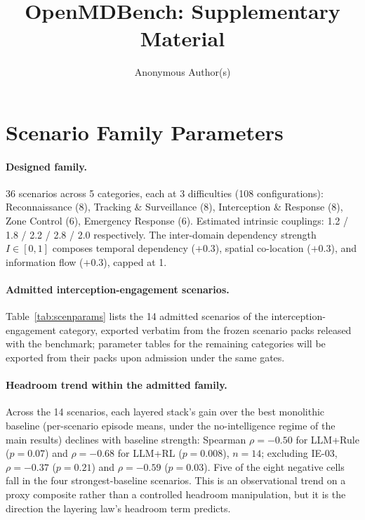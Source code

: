\documentclass[sigconf,anonymous]{aamas}
\title[OpenMDBench]{OpenMDBench: Supplementary Material}
\author{Anonymous Author(s)}
\affiliation{%
  \institution{Anonymous Institution}
  \city{}
  \country{}}
\begin{document}
\maketitle

\section{Scenario Family Parameters}\label{app:A}

\paragraph{Designed family.}
36 scenarios across 5 categories, each at 3 difficulties (108 configurations): Reconnaissance (8), Tracking \& Surveillance (8), Interception \& Response (8), Zone Control (6), Emergency Response (6). Estimated intrinsic couplings: 1.2 / 1.8 / 2.2 / 2.8 / 2.0 respectively. The inter-domain dependency strength $I \in [0,1]$ composes temporal dependency ($+0.3$), spatial co-location ($+0.3$), and information flow ($+0.3$), capped at 1.

\paragraph{Admitted interception-engagement scenarios.}
Table~\ref{tab:scenparams} lists the 14 admitted scenarios of the interception-engagement category, exported verbatim from the frozen scenario packs released with the benchmark; parameter tables for the remaining categories will be exported from their packs upon admission under the same gates.



\paragraph{Headroom trend within the admitted family.}
Across the 14 scenarios, each layered stack's gain over the best monolithic baseline (per-scenario episode means, under the no-intelligence regime of the main results) declines with baseline strength: Spearman $\rho = -0.50$ for LLM+Rule ($p = 0.07$) and $\rho = -0.68$ for LLM+RL ($p = 0.008$), $n = 14$; excluding IE-03, $\rho = -0.37$ ($p = 0.21$) and $\rho = -0.59$ ($p = 0.03$). Five of the eight negative cells fall in the four strongest-baseline scenarios. This is an observational trend on a proxy composite rather than a controlled headroom manipulation, but it is the direction the layering law's headroom term predicts.
\end{document}
